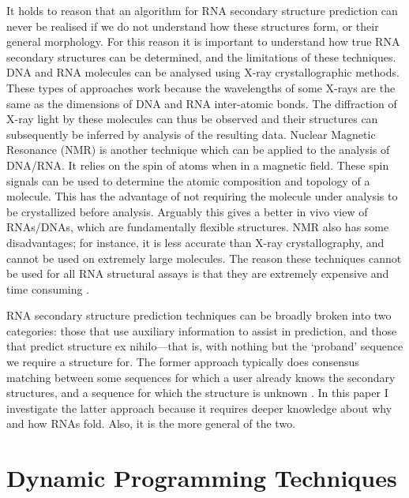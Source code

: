 \documentclass{cshonours}
\begin{document}
It holds to reason that an algorithm for RNA secondary structure prediction can never be realised if we do not understand how these structures form, or their general morphology. For this reason it is important to understand how true RNA secondary structures can be determined, and the limitations of these techniques. DNA and RNA molecules can be analysed using X-ray crystallographic methods. These types of approaches work because the wavelengths of some X-rays are the same as the dimensions of DNA and RNA inter-atomic bonds. The diffraction of X-ray light by these molecules can thus be observed and their structures can subsequently be inferred by analysis of the resulting data. Nuclear Magnetic Resonance (NMR) is another technique which can be applied to the analysis of DNA/RNA. It relies on the spin of atoms when in a magnetic field. These spin signals can be used to determine the atomic composition and topology of a molecule. This has the advantage of not requiring the molecule under analysis to be crystallized before analysis. Arguably this gives a better in vivo view of RNAs/DNAs, which are fundamentally flexible structures. NMR also has some disadvantages; for instance, it is less accurate than X-ray crystallography, and cannot be used on extremely large molecules. The reason these techniques cannot be used for all RNA structural assays is that they are extremely expensive and time consuming \cite{neidle2010principles}.


RNA secondary structure prediction techniques can be broadly broken into two categories: those that use auxiliary information to assist in prediction, and those that predict structure ex nihilo---that is, with nothing but the `proband' sequence we require a structure for. The former approach typically does consensus matching between some sequences for which a user already knows the secondary structures, and a sequence for which the structure is unknown \cite{hofacker2008rna}. In this paper I investigate the latter approach because it requires deeper knowledge about why and how RNAs fold. Also, it is the more general of the two.



\section{Dynamic Programming Techniques}
\end{document}
